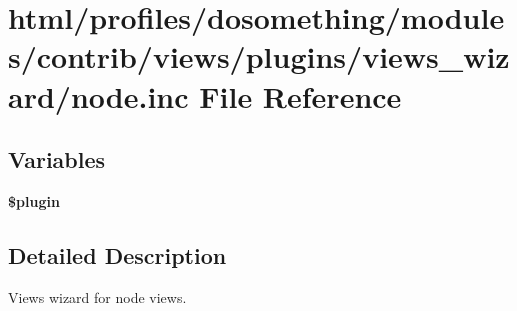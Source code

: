 \hypertarget{views_2plugins_2views__wizard_2node_8inc}{
\section{html/profiles/dosomething/modules/contrib/views/plugins/views\_\-wizard/node.inc File Reference}
\label{views_2plugins_2views__wizard_2node_8inc}
}
\subsection*{Variables}
\begin{DoxyCompactItemize}
\item 
\hypertarget{views_2plugins_2views__wizard_2node_8inc_ada8a7130088351710bb02ed622d6bf65}{
{\bfseries \$plugin}}
\label{views_2plugins_2views__wizard_2node_8inc_ada8a7130088351710bb02ed622d6bf65}

\end{DoxyCompactItemize}


\subsection{Detailed Description}
Views wizard for node views. 